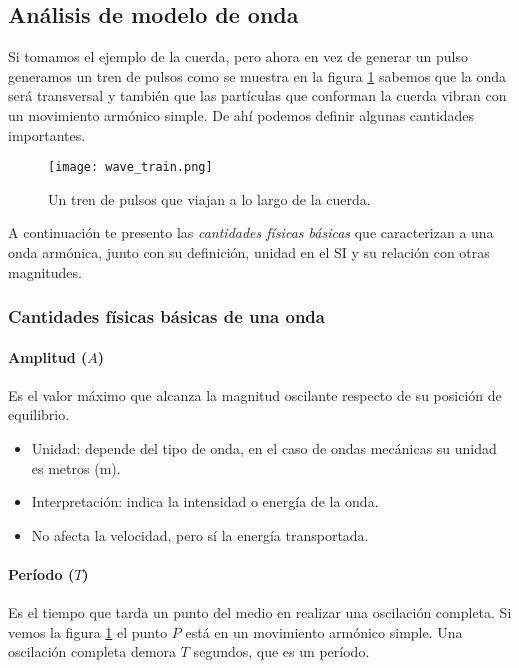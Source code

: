 \subsection{Análisis de modelo de onda}

Si tomamos el ejemplo de la cuerda, pero ahora en vez de generar un pulso generamos un tren de pulsos como se muestra en la figura \ref{fig:wave_train} sabemos que la onda será transversal y también que las partículas que conforman la cuerda vibran con un movimiento armónico simple. De ahí podemos definir algunas cantidades importantes.

\begin{figure}[ht]
  \centering
  \texttt{[image: wave\_train.png]}
  \caption{Un tren de pulsos que viajan a lo largo de la cuerda.}
  \label{fig:wave_train}
\end{figure}

A continuación te presento las \textit{cantidades físicas básicas} que caracterizan a una onda armónica, junto con su definición, unidad en el SI y su relación con otras magnitudes.

\subsubsection{Cantidades físicas básicas de una onda}
\label{sec:waves_basic_quantities}

\paragraph{Amplitud (\(A\))}

Es el valor máximo que alcanza la magnitud oscilante respecto de su posición de equilibrio.

\begin{itemize}
  \item Unidad: depende del tipo de onda, en el caso de ondas mecánicas su unidad es metros (\(\si{\meter}\)).
  \item Interpretación: indica la intensidad o energía de la onda.
  \item No afecta la velocidad, pero sí la energía transportada.
\end{itemize}

\paragraph{Período (\(T\))}

Es el tiempo que tarda un punto del medio en realizar una oscilación completa. Si vemos la figura \ref{fig:wave_train} el punto \(P\) está en un movimiento armónico simple. Una oscilación completa demora \(T\) segundos, que es un período. 

